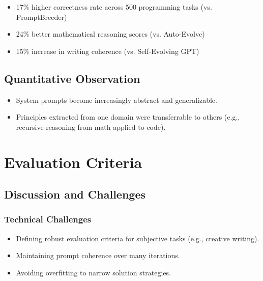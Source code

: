 \documentclass[10pt,a4paper,twocolumn]{article}
\begin{document}
\begin{itemize}
    \item 17\% higher correctness rate across 500 programming tasks (vs. PromptBreeder)
    \item 24\% better mathematical reasoning scores (vs. Auto-Evolve)
    \item 15\% increase in writing coherence (vs. Self-Evolving GPT)
\end{itemize}



\subsection{Quantitative Observation}


\begin{itemize}
    \item System prompts become increasingly abstract and generalizable.
    \item Principles extracted from one domain were transferrable to others (e.g., recursive reasoning from math applied to code).
\end{itemize}







\section{Evaluation Criteria} 


\subsection{Discussion and Challenges}




\subsubsection{Technical Challenges}



\begin{itemize}
    \item Defining robust evaluation criteria for subjective tasks (e.g., creative writing).
    \item Maintaining prompt coherence over many iterations.
    \item Avoiding overfitting to narrow solution strategies.
\end{itemize}
\end{document}

